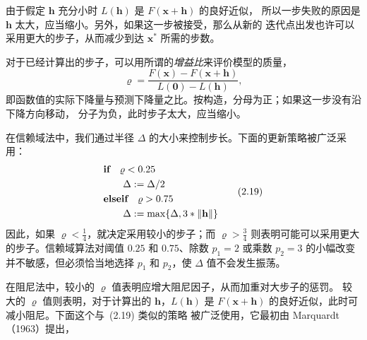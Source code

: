 由于假定 $\mathbf{h}$ 充分小时 $L(\mathbf{h})$ 是 $F(\mathbf{x}+\mathbf{h})$ 的良好近似，
所以一步失败的原因是 $\mathbf{h}$ 太大，应当缩小。另外，如果这一步被接受，那么从新的
迭代点出发也许可以采用更大的步子，从而减少到达 $\mathbf{x}^{\ast}$ 所需的步数。

对于已经计算出的步子，可以用所谓的\emph{增益比}来评价模型的质量，
\begin{equation}
  \varrho=\frac{F(\mathbf{x})-F(\mathbf{x}+\mathbf{h})}{L(\mathbf{0})-L(\mathbf{h})},
  \tag{2.18}\label{eq:2.18}
\end{equation}
即函数值的实际下降量与预测下降量之比。按构造，分母为正；如果这一步没有沿下降方向移动，
分子为负，此时步子太大，应当缩小。

在信赖域法中，我们通过半径 $\Delta$ 的大小来控制步长。下面的更新策略被广泛采用：
\begin{equation}
\begin{aligned}
  &\textbf{if}\quad\varrho<0.25\\
  &\qquad\Delta:=\Delta/2\\
  &\textbf{elseif}\quad\varrho>0.75\\
  &\qquad\Delta:=\max\{\Delta,3*\lVert\mathbf{h}\rVert\}
\end{aligned}
\tag{2.19}\label{eq:2.19}
\end{equation}
因此，如果 $\varrho<\tfrac14$，就决定采用较小的步子；而 $\varrho>\tfrac34$
则表明可能可以采用更大的步子。信赖域算法对阈值 $0.25$ 和 $0.75$、除数 $p_1=2$
或乘数 $p_2=3$ 的小幅改变并不敏感，但必须恰当地选择 $p_1$ 和 $p_2$，使
$\Delta$ 值不会发生振荡。

在阻尼法中，较小的 $\varrho$ 值表明应增大阻尼因子，从而加重对大步子的惩罚。
较大的 $\varrho$ 值则表明，对于计算出的 $\mathbf{h}$，$L(\mathbf{h})$ 是
$F(\mathbf{x}+\mathbf{h})$ 的良好近似，此时可减小阻尼。下面这个与~(2.19) 类似的策略
被广泛使用，它最初由 Marquardt（1963）提出，

